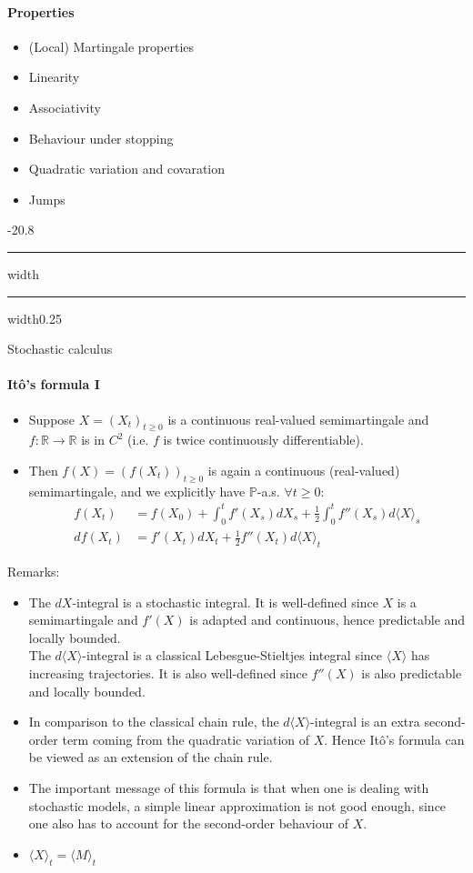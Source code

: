 \documentclass[a4paper,landscape,8pt,fleqn]{scrartcl}
\makeatletter
\renewcommand{\subsection}{\@startsection{subsection}{1}{0mm}%
{-2\baselineskip}{0.8\baselineskip}%
{\hrule depth 0.2pt width\columnwidth\hrule depth0.75pt
width0.25\columnwidth\vspace*{1.2em}\large\bfseries}}
\makeatother
\begin{document}
\begin{multicols*}{3}
\paragraph{Properties}

\begin{itemize}
\item (Local) Martingale properties
\item Linearity
\item Associativity
\item Behaviour under stopping
\item Quadratic variation and covaration
\item Jumps
\end{itemize}

\subsection{Stochastic calculus}

\paragraph{Itô's formula I}

\begin{itemize}
\item Suppose $X = (X_t)_{t \geq 0}$ is a continuous real-valued semimartingale and $f : \mathbb{R} \rightarrow \mathbb{R}$ is in $C^2$ (i.e. $f$ is twice continuously differentiable).
\item Then $f(X) = (f(X_t))_{t \geq 0}$ is again a continuous (real-valued) semimartingale, and we explicitly have $\mathbb{P}$-a.s. $\forall t \geq 0$:
\begin{align*}
f(X_t) &= f(X_0) + \int_0^t f'(X_s) dX_s + \frac{1}{2} \int_0^t f''(X_s) d \langle X \rangle_s \\
df(X_t) &= f'(X_t) dX_t + \frac{1}{2} f''(X_t) d \langle X \rangle_t
\end{align*}
\end{itemize}
Remarks:
\begin{itemize}
\item The $dX$-integral is a stochastic integral. It is well-defined since $X$ is a semimartingale and $f'(X)$ is adapted and continuous, hence predictable and locally bounded. \\
The $d\langle X \rangle$-integral is a classical Lebesgue-Stieltjes integral since $\langle X \rangle$ has increasing trajectories. It is also well-defined since $f''(X)$ is also predictable and locally bounded.
\item In comparison to the classical chain rule, the $d\langle X \rangle$-integral is an extra second-order term coming from the quadratic variation of $X$. Hence Itô's formula can be viewed as an extension of the chain rule.
\item The important message of this formula is that when one is dealing with stochastic models, a simple linear approximation is not good enough, since one also has to account for the second-order behaviour of $X$.
\item $\langle X \rangle_t = \langle M \rangle_t$
\end{itemize}


\end{multicols*}
\end{document}
